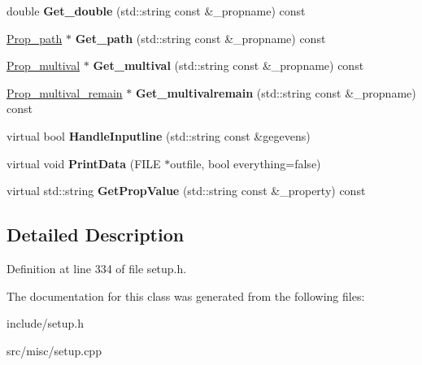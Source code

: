 \begin{DoxyCompactItemize}
\item 
\hypertarget{classSection__prop_ac7dd360e460d869bdcaa531693249a22}{double {\bfseries Get\-\_\-double} (std\-::string const \&\-\_\-propname) const }\label{classSection__prop_ac7dd360e460d869bdcaa531693249a22}

\item 
\hypertarget{classSection__prop_a8522e241de9dfcf71331b6f1dbc16841}{\hyperlink{classProp__path}{Prop\-\_\-path} $\ast$ {\bfseries Get\-\_\-path} (std\-::string const \&\-\_\-propname) const }\label{classSection__prop_a8522e241de9dfcf71331b6f1dbc16841}

\item 
\hypertarget{classSection__prop_a4471da0d01d645126b419f3698b2975c}{\hyperlink{classProp__multival}{Prop\-\_\-multival} $\ast$ {\bfseries Get\-\_\-multival} (std\-::string const \&\-\_\-propname) const }\label{classSection__prop_a4471da0d01d645126b419f3698b2975c}

\item 
\hypertarget{classSection__prop_abbb6160985f12a56526911ab1de6f8ed}{\hyperlink{classProp__multival__remain}{Prop\-\_\-multival\-\_\-remain} $\ast$ {\bfseries Get\-\_\-multivalremain} (std\-::string const \&\-\_\-propname) const }\label{classSection__prop_abbb6160985f12a56526911ab1de6f8ed}

\item 
\hypertarget{classSection__prop_aa18fa3fb45cdc41e54a15f1416a43914}{virtual bool {\bfseries Handle\-Inputline} (std\-::string const \&gegevens)}\label{classSection__prop_aa18fa3fb45cdc41e54a15f1416a43914}

\item 
\hypertarget{classSection__prop_aa49bc0d729b288d862e1db9cfc6e107c}{virtual void {\bfseries Print\-Data} (F\-I\-L\-E $\ast$outfile, bool everything=false)}\label{classSection__prop_aa49bc0d729b288d862e1db9cfc6e107c}

\item 
\hypertarget{classSection__prop_a6b6444bff385109361d271103aafdd4e}{virtual std\-::string {\bfseries Get\-Prop\-Value} (std\-::string const \&\-\_\-property) const }\label{classSection__prop_a6b6444bff385109361d271103aafdd4e}

\end{DoxyCompactItemize}


\subsection{Detailed Description}


Definition at line 334 of file setup.\-h.



The documentation for this class was generated from the following files\-:\begin{DoxyCompactItemize}
\item 
include/setup.\-h\item 
src/misc/setup.\-cpp\end{DoxyCompactItemize}

